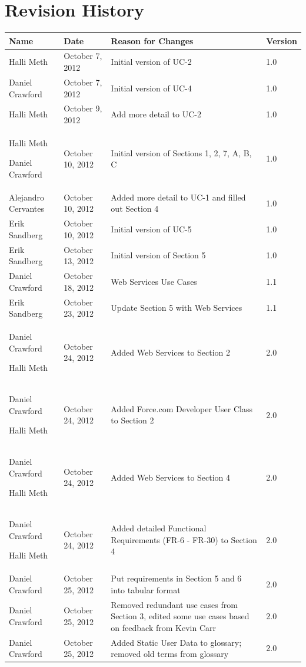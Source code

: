 \documentclass[12pt,oneside,letterpaper]{article}
\begin{document}
\section*{Revision History}
\begin{tabular}{|l|l|p{2.5in}|l|}
\hline
\textbf{Name}&\textbf{Date}&\textbf{Reason for Changes}&\textbf{Version}\\
\hline
Halli Meth&October 7, 2012&Initial version of UC-2&1.0\\
\hline
Daniel Crawford&October 7, 2012&Initial version of UC-4&1.0\\
\hline
Halli Meth&October 9, 2012&Add more detail to UC-2&1.0\\
\hline
\parbox[t]{1.25in}{Halli Meth \par Daniel Crawford\strut}&October 10, 2012&Initial version of Sections 1, 2, 7, A, B, C&1.0\\
\hline
Alejandro Cervantes&October 10, 2012&Added more detail to UC-1 and filled out Section 4&1.0\\
\hline
Erik Sandberg & October 10, 2012 & Initial version of UC-5 & 1.0\\
\hline
Erik Sandberg & October 13, 2012 & Initial version of Section 5 & 1.0\\
\hline
Daniel Crawford&October 18, 2012&Web Services Use Cases&1.1\\
\hline
Erik Sandberg & October 23, 2012 & Update Section 5 with Web Services & 1.1\\
\hline
\parbox[t]{1.25in}{Daniel Crawford \par Halli Meth\strut}&October 24, 2012&Added Web Services to Section 2&2.0\\
\hline
\parbox[t]{1.25in}{Daniel Crawford \par Halli Meth\strut}&October 24, 2012&Added Force.com Developer User Class to Section 2&2.0\\
\hline
\parbox[t]{1.25in}{Daniel Crawford \par Halli Meth\strut}&October 24, 2012&Added Web Services to Section 4&2.0\\
\hline
\parbox[t]{1.25in}{Daniel Crawford \par Halli Meth\strut}&October 24, 2012&Added detailed Functional Requirements (FR-6 - FR-30) to Section 4&2.0\\
\hline
Daniel Crawford & October 25, 2012 &Put requirements in Section 5 and 6 into tabular format&2.0\\
\hline
Daniel Crawford & October 25, 2012 &Removed redundant use cases from Section 3, edited some use cases based on feedback from Kevin Carr&2.0\\
\hline
Daniel Crawford & October 25, 2012 &Added Static User Data to glossary; removed old terms from glossary&2.0\\
\hline
\end{tabular}
\end{document}
